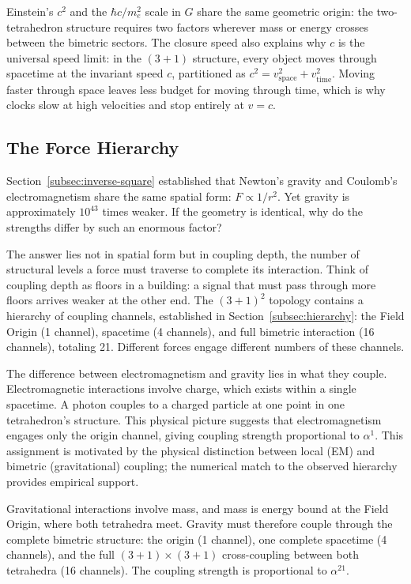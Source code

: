 \documentclass[aps,prd,preprint,superscriptaddress,showpacs,preprintnumbers,amsmath,amssymb,nofootinbib]{revtex4-2}
\begin{document}
Einstein's $c^2$ and the $\hbar c/m_e^2$ scale in $G$ share the same geometric origin: the two-tetrahedron structure requires two factors wherever mass or energy crosses between the bimetric sectors. The closure speed also explains why $c$ is the universal speed limit: in the $(3+1)$ structure, every object moves through spacetime at the invariant speed $c$, partitioned as $c^2 = v_{\text{space}}^2 + v_{\text{time}}^2$. Moving faster through space leaves less budget for moving through time, which is why clocks slow at high velocities and stop entirely at $v = c$.

\subsection{The Force Hierarchy}
\label{subsec:hierarchy-eq}

Section~\ref{subsec:inverse-square} established that Newton's gravity and Coulomb's electromagnetism share the same spatial form: $F \propto 1/r^2$. Yet gravity is approximately $10^{43}$ times weaker. If the geometry is identical, why do the strengths differ by such an enormous factor?

The answer lies not in spatial form but in coupling depth, the number of structural levels a force must traverse to complete its interaction. Think of coupling depth as floors in a building: a signal that must pass through more floors arrives weaker at the other end. The $(3+1)^2$ topology contains a hierarchy of coupling channels, established in Section~\ref{subsec:hierarchy}: the Field Origin (1 channel), spacetime (4 channels), and full bimetric interaction (16 channels), totaling 21. Different forces engage different numbers of these channels.

The difference between electromagnetism and gravity lies in what they couple. Electromagnetic interactions involve charge, which exists within a single spacetime. A photon couples to a charged particle at one point in one tetrahedron's structure. This physical picture suggests that electromagnetism engages only the origin channel, giving coupling strength proportional to $\alpha^1$. This assignment is motivated by the physical distinction between local (EM) and bimetric (gravitational) coupling; the numerical match to the observed hierarchy provides empirical support.

Gravitational interactions involve mass, and mass is energy bound at the Field Origin, where both tetrahedra meet. Gravity must therefore couple through the complete bimetric structure: the origin (1 channel), one complete spacetime (4 channels), and the full $(3+1) \times (3+1)$ cross-coupling between both tetrahedra (16 channels). The coupling strength is proportional to $\alpha^{21}$.
\end{document}
